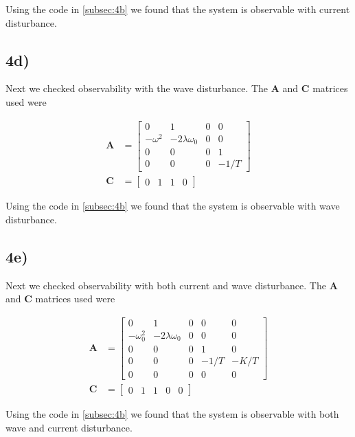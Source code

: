 Using the code in \cref{subsec:4b} we found that the system is observable with current disturbance.

\subsection{4d)}

Next we checked observability with the wave disturbance. The $\mathbf{A}$ and $\mathbf{C}$ matrices used were

\begin{subequations}
    \begin{align}
        \mathbf{A} &= \begin{bmatrix}
        0 & 1 & 0 & 0 \\
        -\omega^2 & -2\lambda\omega_0 & 0 & 0 \\
        0 & 0 & 0 & 1 \\
        0 & 0 & 0 & - 1/T
        \end{bmatrix} \\
        \mathbf{C} &= \begin{bmatrix}
        0 & 1 & 1 & 0
        \end{bmatrix}
    \end{align}
\end{subequations}

Using the code in \cref{subsec:4b} we found that the system is observable with wave disturbance.

\subsection{4e)}

Next we checked observability with both current and wave disturbance. The $\mathbf{A}$ and $\mathbf{C}$ matrices used were

\begin{subequations}
    \begin{align}
        \mathbf{A} &= \begin{bmatrix}
        0 & 1 & 0 & 0 & 0 \\
        -\omega_0^2 & -2\lambda\omega_0 & 0 & 0 & 0 \\
        0 & 0 & 0 & 1 & 0 \\
        0 & 0 & 0 & -1/T & -K/T \\
        0 & 0 & 0 & 0 & 0
        \end{bmatrix} \\
        \mathbf{C} &= \begin{bmatrix}
        0 & 1 & 1 & 0 & 0
        \end{bmatrix}
    \end{align}
\end{subequations}

Using the code in \cref{subsec:4b} we found that the system is observable with both wave and current disturbance.
